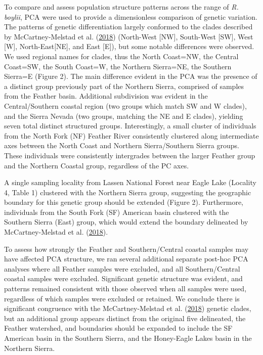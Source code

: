 \documentclass[proquest,12pt,final]{ucthesis-CA2012} %
\begin{document}
\begin{ucmainmatter}
To compare and assess population structure patterns across the range of
\emph{R. boylii}, PCA were used to provide a dimensionless comparison of
genetic variation. The patterns of genetic differentiation largely
conformed to the clades described by McCartney-Melstad et al.
(\protect\hyperlink{ref-mccartney-melstad_population_2018}{2018})
(North-West {[}NW{]}, South-West {[}SW{]}, West {[}W{]},
North-East{[}NE{]}, and East {[}E{]}), but some notable differences were
observed. We used regional names for clades, thus the North Coast=NW,
the Central Coast=SW, the South Coast=W, the Northern Sierra=NE, the
Southern Sierra=E (Figure 2). The main difference evident in the PCA was
the presence of a distinct group previously part of the Northern Sierra,
comprised of samples from the Feather basin. Additional subdivision was
evident in the Central/Southern coastal region (two groups which match
SW and W clades), and the Sierra Nevada (two groups, matching the NE and
E clades), yielding seven total distinct structured groups.
Interestingly, a small cluster of individuals from the North Fork (NF)
Feather River consistently clustered along intermediate axes between the
North Coast and Northern Sierra/Southern Sierra groups. These
individuals were consistently intergrades between the larger Feather
group and the Northern Coastal group, regardless of the PC axes.

A single sampling locality from Lassen National Forest near Eagle Lake
(Locality 4, Table 1) clustered with the Northern Sierra group,
suggesting the geographic boundary for this genetic group should be
extended (Figure 2). Furthermore, individuals from the South Fork (SF)
American basin clustered with the Southern Sierra (East) group, which
would extend the boundary delineated by McCartney-Melstad et al.
(\protect\hyperlink{ref-mccartney-melstad_population_2018}{2018}).

To assess how strongly the Feather and Southern/Central coastal samples
may have affected PCA structure, we ran several additional separate
post-hoc PCA analyses where all Feather samples were excluded, and all
Southern/Central coastal samples were excluded. Significant genetic
structure was evident, and patterns remained consistent with those
observed when all samples were used, regardless of which samples were
excluded or retained. We conclude there is significant congruence with
the McCartney-Melstad et al.
(\protect\hyperlink{ref-mccartney-melstad_population_2018}{2018})
genetic clades, but an additional group appears distinct from the
original five delineated, the Feather watershed, and boundaries should
be expanded to include the SF American basin in the Southern Sierra, and
the Honey-Eagle Lakes basin in the Northern Sierra.










\end{ucmainmatter}
\end{document}
